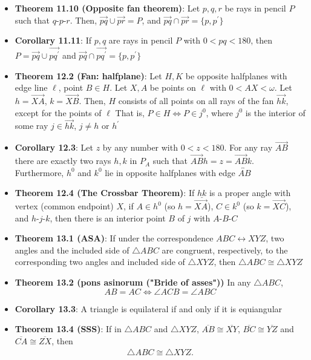 \documentclass{report}
\begin{document}
\begin{itemize}
        \item \textbf{Theorem 11.10 (Opposite fan theorem)}: Let $p,q,r$ be rays in pencil $P$ such that $ q\text{-}p\text{-}r$. Then, $ \overrightarrow{pq} \cup \overrightarrow{pr} = P$, and $ \overrightarrow{pq} \cap \overrightarrow{pr} = \{p,p^{\prime}\} $
        \item \textbf{Corollary 11.11}: If $p,q$ are rays in pencil $P$ with $0 < pq < 180$, then $P = \overrightarrow{pq} \cup \overrightarrow{pq^{\prime}} $ and $\overrightarrow{pq} \cap \overrightarrow{pq^{\prime}} = \{p,p^{\prime}\}$
        \item \textbf{Theorem 12.2 (Fan: halfplane)}: Let $H,K$ be opposite halfplanes with edge line $\ell$, point $B \in H$. Let $X,A$ be points on $\ell$ with $0 < AX < \omega$. Let $h = \overrightarrow{XA}$, $k = \overrightarrow{XB}$. Then, $H $ consists of all points on all rays of the fan $\overrightarrow{hk}$, except for the points of $\ell$
            \bigbreak \noindent 
            That is, $P \in H \iff P \in j^{0}$, where $j^{0}$ is the interior of some ray $j \in \overrightarrow{hk}$, $j \ne h$ or $h^{\prime}$
        \item \textbf{Corollary 12.3}: Let $z$ by any number with $0 < z < 180$. For any ray $\overrightarrow{AB}$ there are exactly two rays $h,k$ in $P_{A}$ such that $\overrightarrow{AB}h = z = \overrightarrow{AB}k$. Furthermore, $h^{0}$ and $k^{0}$ lie in opposite halfplanes with edge $\overleftrightarrow{AB} $
        \item \textbf{Theorem 12.4 (The Crossbar Theorem)}: If $\underline{hk}$ is a proper angle with vertex (common endpoint) $X$, if $A \in h^{0}$ (so $h = \overrightarrow{XA}$), $C \in k^{0}$ (so $k = \overrightarrow{XC}$), and $ h\text{-}j\text{-}k$, then there is an interior point $B$ of $j$ with $ A\text{-}B\text{-}C$
        \item \textbf{Theorem 13.1 (ASA)}: If under the correspondence $ABC \leftrightarrow XYZ$, two angles and the included side of $\triangle ABC$ are congruent, respectively, to the corresponding two angles and included side of $\triangle XYZ$, then $\triangle ABC \cong \triangle XYZ $
        \item \textbf{Theorem 13.2 (pons asinorum ("Bride of asses"))} In any $\triangle ABC$, 
            $$ AB = AC \iff \angle ACB = \angle ABC $$
        \item \textbf{Corollary 13.3}: A triangle is equilateral if and only if it is equiangular
        \item \textbf{Theorem 13.4 (SSS)}: If in $\triangle ABC$ and $\triangle XYZ$, $\overline{AB} \cong \overline{XY}$, $ \overline{BC} \cong \overline{YZ}$ and $\overline{CA} \cong \overline{ZX}$, then 
            \begin{align*}
                \triangle ABC \cong \triangle XYZ
            .\end{align*}

    \end{itemize}
\end{document}
